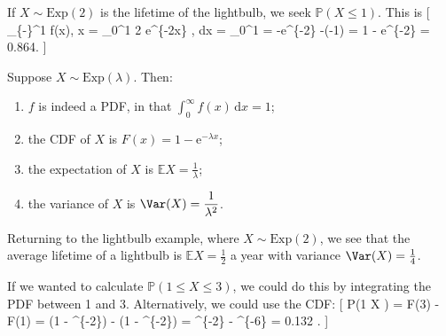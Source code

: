 \documentclass[
  letterpaper,
  DIV=11,
  numbers=noendperiod]{scrreprt}
\providecommand{\tightlist}{%
  \setlength{\itemsep}{0pt}\setlength{\parskip}{0pt}}\usepackage{longtable,booktabs,array}
\theoremstyle{remark}
\begin{document}
If \(X \sim \text{Exp}(2)\) is the lifetime of the lightbulb, we seek
\(\mathbb P(X \leq 1)\). This is {[} \int\_\{-\infty\}\^{}1 f(x),
x = \int\_0\^{}1 2 \mathrm e\^{}\{-2x\} , \mathrm dx =
\_0\^{}1 = -\mathrm e\^{}\{-2\} -(-1) = 1 -
\mathrm e\^{}\{-2\} = 0.864. {]}

\leavevmode{}%
Suppose \(X \sim \text{Exp}(\lambda)\). Then:

\begin{enumerate}
\def\labelenumi{\arabic{enumi}.}
\tightlist
\item
  \(f\) is indeed a PDF, in that
  \(\displaystyle\int_0^\infty f(x)\,\mathrm{d}x = 1\);
\item
  the CDF of \(X\) is \(F(x) = 1 - \mathrm{e}^{-\lambda x}\);
\item
  the expectation of \(X\) is
  \(\mathbb EX = \displaystyle\frac{1}{\lambda}\);
\item
  the variance of \(X\) is
  \(\Var(X) = \displaystyle\frac{1}{\lambda^2}\).
\end{enumerate}

Returning to the lightbulb example, where \(X \sim \text{Exp}(2)\), we
see that the average lifetime of a lightbulb is \(\mathbb EX = \frac12\)
a year with variance \(\Var(X) = \frac14\).

If we wanted to calculate \(\mathbb P(1 \leq X \leq 3)\), we could do
this by integrating the PDF between 1 and 3. Alternatively, we could use
the CDF: {[} \mathbb P(1 \leq X ) = F(3) - F(1) = (1 -
\^{}\{-2\}) - (1 - \^{}\{-2\}) =
\^{}\{-2\} - \^{}\{-6\} = 0.132 . {]}
\end{document}
